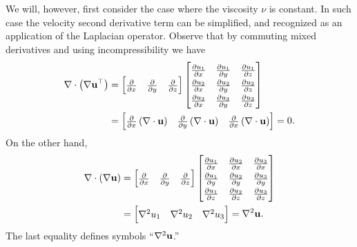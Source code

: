 We will, however, first consider the case where the viscosity $\nu$ is constant.  In such case the velocity second derivative term can be simplified, and recognized as an application of the Laplacian operator.  Observe that by commuting mixed derivatives and using incompressibility we have
\begin{align*}
\Div \left(\grad \bu^{\top}\right) &= \renewcommand{\arraystretch}{1.3}\begin{bmatrix}
    \frac{\partial}{\partial x} & \frac{\partial}{\partial y} & \frac{\partial}{\partial z}
    \end{bmatrix}
    \begin{bmatrix}
    \frac{\partial u_1}{\partial x} & \frac{\partial u_1}{\partial y} & \frac{\partial u_1}{\partial z} \\
    \frac{\partial u_2}{\partial x} & \frac{\partial u_2}{\partial y} & \frac{\partial u_2}{\partial z} \\
    \frac{\partial u_3}{\partial x} & \frac{\partial u_3}{\partial y} & \frac{\partial u_3}{\partial z}
    \end{bmatrix} \\
  &= \begin{bmatrix}
    \frac{\partial}{\partial x}\left(\Div \bu\right) & \frac{\partial}{\partial y }\left(\Div \bu\right) & \frac{\partial}{\partial x} \left(\Div \bu\right)
    \end{bmatrix}
    = 0.
\end{align*}
On the other hand,
\begin{align*}
\Div \left(\grad \bu\right) &= \renewcommand{\arraystretch}{1.3}\begin{bmatrix}
    \frac{\partial}{\partial x} & \frac{\partial}{\partial y} & \frac{\partial}{\partial z}
    \end{bmatrix}
    \begin{bmatrix}
    \frac{\partial u_1}{\partial x} & \frac{\partial u_2}{\partial x} & \frac{\partial u_3}{\partial x} \\
    \frac{\partial u_1}{\partial y} & \frac{\partial u_2}{\partial y} & \frac{\partial u_3}{\partial y} \\
    \frac{\partial u_1}{\partial z} & \frac{\partial u_2}{\partial z} & \frac{\partial u_3}{\partial z}
    \end{bmatrix} \\
  &= \begin{bmatrix} \grad^2 u_1 & \grad^2 u_2 & \grad^2 u_3 \end{bmatrix} = \grad^2 \bu.
\end{align*}
The last equality defines symbols ``$\nabla^2 \mathbf{u}$.''

